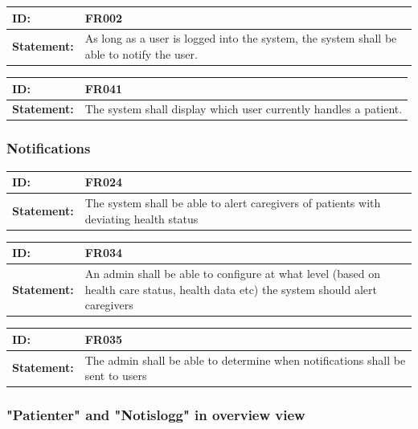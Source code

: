 \documentclass{scrreprt}
\begin{document}
\begin{center}
\begin{tabularx}{\linewidth}{| l | X |}
 \hline
 \textbf{ID:} & FR002  \\ 
 \hline
 \textbf{Statement:} & As long as a user is logged into the system, the system shall be able to notify the user. \\ 
 \hline
\end{tabularx}

\begin{tabularx}{\linewidth}{| l | X |}
 \hline
 \textbf{ID:} & FR041  \\ 
 \hline
 \textbf{Statement:} & The system shall display which user currently handles a patient. \\ 
 \hline
\end{tabularx}
\end{center}


\subsubsection{Notifications}
\begin{center}
\begin{tabularx}{\linewidth}{| l | X |}
 \hline
 \textbf{ID:} & FR024  \\ 
 \hline
 \textbf{Statement:} & The system shall be able to alert caregivers of patients with deviating health status \\ 
 \hline
\end{tabularx}

\begin{tabularx}{\linewidth}{| l | X |}
 \hline
 \textbf{ID:} & FR034  \\ 
 \hline
 \textbf{Statement:} & An admin shall be able to configure at what level (based on health care status, health data etc) the system should alert caregivers\\ 
 \hline
\end{tabularx}

\begin{tabularx}{\linewidth}{| l | X |}
 \hline
 \textbf{ID:} & FR035  \\ 
 \hline
 \textbf{Statement:} & The admin shall be able to determine when notifications shall be sent to users\\ 
 \hline
\end{tabularx}

\end{center}
\subsubsection{"Patienter" and "Notislogg" in overview view}
\end{document}
